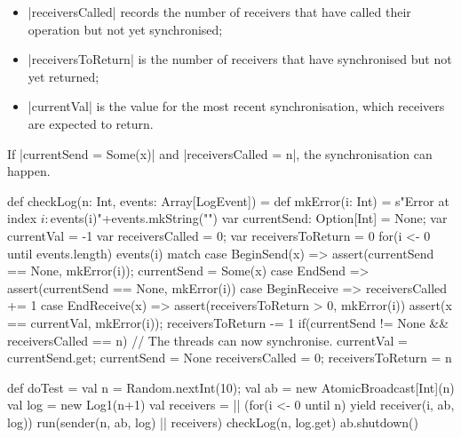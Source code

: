 \begin{answerS}
\begin{itemize}
\item |receiversCalled| records the number of receivers that have called their
  operation but not yet synchronised;

\item |receiversToReturn| is the number of receivers that have synchronised
  but not yet returned;

\item |currentVal| is the value for the most recent synchronisation, which
  receivers are expected to return.
\end{itemize}
%
If |currentSend = Some(x)| and |receiversCalled = n|, the synchronisation can
happen.  
%
\begin{scala}
  def checkLog(n: Int, events: Array[LogEvent]) = {
    def mkError(i: Int) = 
      s"Error at index $i: ${events(i)}\n"+events.mkString("\n")
    var currentSend: Option[Int] = None; var currentVal = -1
    var receiversCalled = 0; var receiversToReturn = 0
    for(i <- 0 until events.length){
      events(i) match{
        case BeginSend(x) => 
          assert(currentSend == None, mkError(i)); currentSend = Some(x)
        case EndSend => assert(currentSend == None, mkError(i))
        case BeginReceive => receiversCalled += 1
        case EndReceive(x) => 
          assert(receiversToReturn > 0, mkError(i))
          assert(x == currentVal, mkError(i)); receiversToReturn -= 1
      }
      if(currentSend != None && receiversCalled == n){
        // The threads can now synchronise.
        currentVal = currentSend.get; currentSend = None
        receiversCalled = 0; receiversToReturn = n
      }
    }
  }

  def doTest = {
    val n = Random.nextInt(10); val ab = new AtomicBroadcast[Int](n)
    val log = new Log1(n+1)
    val receivers = || (for(i <- 0 until n) yield receiver(i, ab, log))
    run(sender(n, ab, log) || receivers)
    checkLog(n, log.get)
    ab.shutdown()
  }
\end{scala}
\end{answerS}
